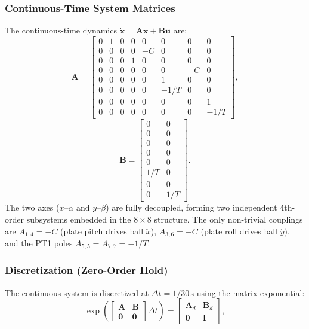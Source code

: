 \documentclass[journal]{IEEEtran}
\begin{document}
\subsubsection{Continuous-Time System Matrices}

The continuous-time dynamics $\dot{\mathbf{x}} = \mathbf{A}\mathbf{x} + \mathbf{B}\mathbf{u}$ are:
%
\begin{equation}
  \mathbf{A} = \begin{bmatrix}
    0 & 1 & 0 & 0 &  0   & 0    &  0   & 0    \\
    0 & 0 & 0 & 0 & -C   & 0    &  0   & 0    \\
    0 & 0 & 0 & 1 &  0   & 0    &  0   & 0    \\
    0 & 0 & 0 & 0 &  0   & 0    & -C   & 0    \\
    0 & 0 & 0 & 0 &  0   & 1    &  0   & 0    \\
    0 & 0 & 0 & 0 &  0   & -1/T &  0   & 0    \\
    0 & 0 & 0 & 0 &  0   & 0    &  0   & 1    \\
    0 & 0 & 0 & 0 &  0   & 0    &  0   & -1/T
  \end{bmatrix},
  \label{eq:A}
\end{equation}
%
\begin{equation}
  \mathbf{B} = \begin{bmatrix}
    0 & 0 \\ 0 & 0 \\ 0 & 0 \\ 0 & 0 \\
    0 & 0 \\ 1/T & 0 \\ 0 & 0 \\ 0 & 1/T
  \end{bmatrix}.
  \label{eq:B}
\end{equation}
%
The two axes ($x$--$\alpha$ and $y$--$\beta$) are fully decoupled, forming two independent 4th-order
subsystems embedded in the $8\times 8$ structure. The only non-trivial couplings are
$A_{1,4} = -C$ (plate pitch drives ball $\ddot{x}$),
$A_{3,6} = -C$ (plate roll drives ball $\ddot{y}$),
and the PT1 poles $A_{5,5} = A_{7,7} = -1/T$.

\subsubsection{Discretization (Zero-Order Hold)}
The continuous system is discretized at $\Delta t = 1/30\,\mathrm{s}$ using the matrix exponential:
%
\begin{equation}
  \exp\!\left(
    \begin{bmatrix} \mathbf{A} & \mathbf{B} \\ \mathbf{0} & \mathbf{0} \end{bmatrix} \Delta t
  \right)
  = \begin{bmatrix} \mathbf{A}_d & \mathbf{B}_d \\ \mathbf{0} & \mathbf{I} \end{bmatrix},
  \label{eq:zoh}
\end{equation}
%
\end{document}
